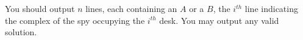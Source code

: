 You should output $n$ lines, each containing an $A$ or a $B$, the $i^{th}$ line indicating
the complex of the spy occupying the $i^{th}$ desk. You may output any valid solution.
